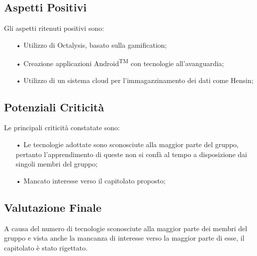 \subsection{Aspetti Positivi}
Gli aspetti ritenuti positivi sono: 
\begin{itemize}
\item[•] Utilizzo di Octalysis, basato sulla gamification;
\item[•] Creazione applicazioni Android\textsuperscript{TM} con tecnologie all'avanguardia;
\item[•] Utilizzo di un sistema cloud per l'immagazzinamento dei dati come Hensin;
\end{itemize}
\subsection{Potenziali Criticità}
Le principali criticità constatate sono:
\begin{itemize}
\item[•] Le tecnologie adottate sono sconosciute alla maggior parte del gruppo, pertanto l'apprendimento di queste non si confà al tempo a disposizione dai singoli membri del gruppo; 
\item[•] Mancato interesse verso il capitolato proposto;
\end{itemize}
\subsection{Valutazione Finale}
A causa del numero di tecnologie sconosciute alla maggior parte dei membri del gruppo e vista anche la mancanza di interesse verso la maggior parte di esse, il capitolato è stato rigettato.

